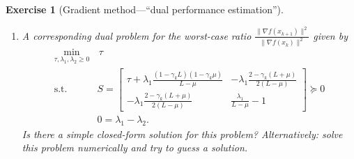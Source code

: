 \documentclass[11pt,a4paper]{article}
\newcommand{\correction}[1]{{{\color{blue}\underline{Correction:} #1}}}
\newcommand{\correction}[1]{}
\newtheorem{exercise}{Exercise}
\begin{document}
\begin{exercise}[Gradient method---``dual performance estimation'']
\begin{enumerate}
	\correction{ Sum the following inequalities with their corresponding weights: $$\begin{array}{r}     f_\star \geqslant      f_k+\langle{g_k};{x_\star-x_k}\rangle+\frac{1}{2L}\lVert{g_k-g_\star}\rVert^2+\frac{\mu}{2(1-\mu/L)}\lVert{x_k-x_\star-\frac{{1}}{L}(g_k-g_\star)}\rVert^2  :\lambda_1,  \\     f_k \geqslant      f_\star+\langle{g_\star};{x_k-x_\star}\rangle+\frac{1}{2L}\lVert{g_k-g_\star}\rVert^2+\frac{\mu}{2(1-\mu/L)}\lVert{x_k-x_\star-\frac{{1}}{L}(g_k-g_\star)}\rVert^2:\lambda_2.     \end{array}$$ We use the following values for the multipliers: $\lambda_1=\lambda_2=2\gamma_k\tau(\mu,L,\gamma_k) \geqslant      0$
After appropriate substitutions of $g_\star$, $x_{k+1}$, and $\tau(\mu,L,\gamma_k)$, using respectively $g_\star=0$, $x_{k+1}=x_k-\gamma g_k$ and $\tau(\mu,L,\gamma_k)=(1-\gamma_k\mu)$, and with little effort, one can check that the previous weighted sum of inequalities can be written in the form: $$ \begin{array}{rl}    \lVert{x_{k+1}-x_\star}\rVert^2  \leqslant      & \left(1-\gamma_k \mu \right)^2\lVert{x_{k}-x_\star}\rVert^2 -\frac{\gamma_k(2-\gamma_k (L+\mu))}{L-\mu} \lVert{\mu {(x_k  -x_\star)} - g_k}\rVert^2. \end{array}$$ This statement can be checked simply by expanding both expressions (i.e., the weighted sum and its reformulation) and verifying that all terms indeed match.	
	}
	
	
	
	
	
	\item A corresponding dual problem for the worst-case ratio $\frac{\|\nabla f(x_{k+1})\|^2}{\|\nabla f(x_k)\|^2}$ given by
	\begin{equation}\label{eq:ex1_dual2}	 
		\begin{aligned}
			\min_{\tau,\lambda_1,\lambda_2\geqslant 0} & \,\tau\\
			\text{s.t. }& S=\begin{bmatrix}
		\tau+\lambda_1 \frac{(1-\gamma_k L)(1-\gamma_k \mu)}{L-\mu} & -\lambda_1\frac{2-\gamma_k(L+\mu)}{2(L-\mu)}\\
		-\lambda_1\frac{2-\gamma_k(L+\mu)}{2(L-\mu)} & \frac{\lambda_1}{L-\mu}-1
			\end{bmatrix}\succcurlyeq 0\\
			&0=\lambda_1-\lambda_2.
		\end{aligned}
		\end{equation} Is there a simple closed-form solution for this problem? Alternatively: solve this problem numerically and try to guess a solution.
		

\end{enumerate}
\end{exercise}
\end{document}
